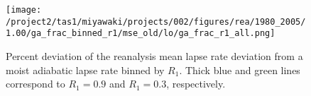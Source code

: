 \documentclass{ametsocV5}
\begin{document}




%

%

\begin{figure}
  \noindent\texttt{[image: /project2/tas1/miyawaki/projects/002/figures/rea/1980\_2005/1.00/ga\_frac\_binned\_r1/mse\_old/lo/ga\_frac\_r1\_all.png]}\\
  \caption{Percent deviation of the reanalysis mean lapse rate deviation from a moist adiabatic lapse rate binned by $R_{1}$. Thick blue and green lines correspond to $R_1=0.9$ and $R_1=0.3$, respectively.}
  \label{fig:rea-binned-r1}
\end{figure}
\end{document}
